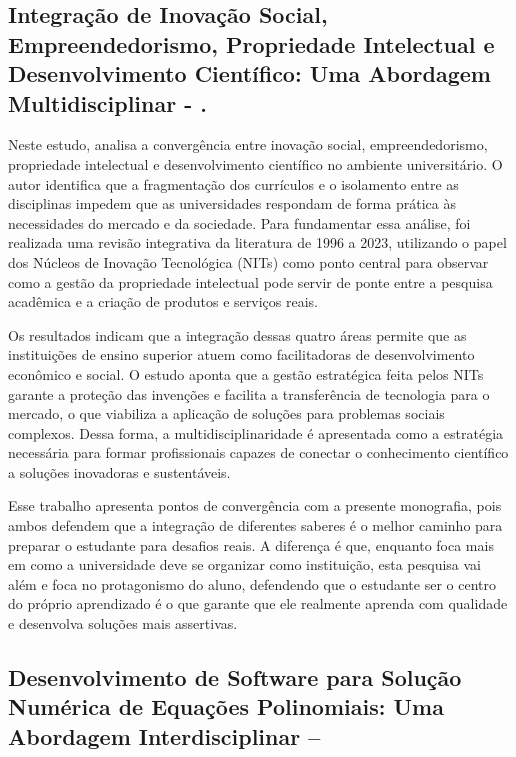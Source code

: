 \subsection{Integração de Inovação Social, Empreendedorismo, Propriedade Intelectual e
	Desenvolvimento Científico: Uma Abordagem Multidisciplinar - .} \label{sec:bentes-2024}

Neste estudo,  analisa a convergência entre inovação social,
empreendedorismo, propriedade intelectual e desenvolvimento científico no
ambiente universitário. O autor identifica que a fragmentação dos currículos e
o isolamento entre as disciplinas impedem que as universidades respondam de
forma prática às necessidades do mercado e da sociedade. Para fundamentar essa
análise, foi realizada uma revisão integrativa da literatura de 1996 a 2023,
utilizando o papel dos Núcleos de Inovação Tecnológica (NITs) como ponto
central para observar como a gestão da propriedade intelectual pode servir de
ponte entre a pesquisa acadêmica e a criação de produtos e serviços reais.

Os resultados indicam que a integração dessas quatro áreas permite que as
instituições de ensino superior atuem como facilitadoras de desenvolvimento
econômico e social. O estudo aponta que a gestão estratégica feita pelos NITs
garante a proteção das invenções e facilita a transferência de tecnologia para
o mercado, o que viabiliza a aplicação de soluções para problemas sociais
complexos. Dessa forma, a multidisciplinaridade é apresentada como a estratégia
necessária para formar profissionais capazes de conectar o conhecimento
científico a soluções inovadoras e sustentáveis.

Esse trabalho apresenta pontos de convergência com a presente monografia, pois
ambos defendem que a integração de diferentes saberes é o melhor caminho para
preparar o estudante para desafios reais. A diferença é que, enquanto 
foca mais em como a universidade deve se organizar como instituição, esta
pesquisa vai além e foca no protagonismo do aluno, defendendo que o estudante
ser o centro do próprio aprendizado é o que garante que ele realmente aprenda
com qualidade e desenvolva soluções mais assertivas.

\subsection{Desenvolvimento de Software para Solução Numérica de Equações Polinomiais:
	Uma Abordagem Interdisciplinar – \cite{silva2024processo}} \label{sec:silva-2018}

